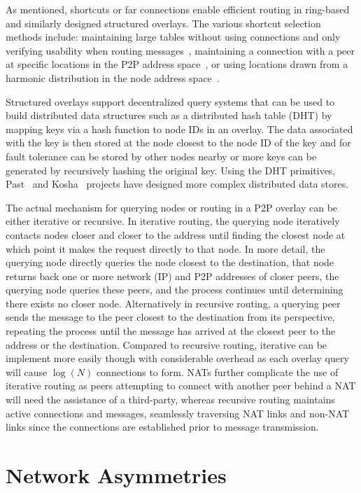 As mentioned, shortcuts or far connections enable efficient routing in
ring-based and similarly designed structured overlays.  The various shortcut
selection methods include: maintaining large tables without using connections
and only verifying usability when routing messages~\cite{pastry, kademlia},
maintaining a connection with a peer at specific locations in the P2P address
space~\cite{chord}, or using locations drawn from a harmonic distribution in
the node address space~\cite{symphony}.

Structured overlays support decentralized query systems that can be used to
build distributed data structures such as a distributed hash table (DHT) by
mapping keys via a hash function to node IDs in an overlay.  The data
associated with the key is then stored at the node closest to the node ID of
the key and for fault tolerance can be stored by other nodes nearby or more
keys can be generated by recursively hashing the original key.  Using the DHT
primitives, Past~\cite{past} and Kosha~\cite{kosha} projects have designed more
complex distributed data stores.

The actual mechanism for querying nodes or routing in a P2P overlay can be
either iterative or recursive.  In iterative routing, the querying node
iteratively contacts nodes closer and closer to the address until finding the
closest node at which point it makes the request directly to that node.  In
more detail, the querying node directly queries the node closest to the
destination, that node returns back one or more network (IP) and P2P addresses
of closer peers, the querying node queries these peers, and the process
continues until determining there exists no closer node.  Alternatively in
recursive routing, a querying peer sends the message to the peer closest to
the destination from its perspective, repeating the process until the message
has arrived at the closest peer to the address or the destination.  Compared
to recursive routing, iterative can be implement more easily though with
considerable overhead as each overlay query will cause $\log(N)$ connections
to form.  NATs further complicate the use of iterative routing as peers
attempting to connect with another peer behind a NAT will need the assistance
of a third-party, whereas recursive routing maintains active connections and
messages, seamlessly traversing NAT links and non-NAT links since the
connections are established prior to message transmission.

\section{Network Asymmetries}

